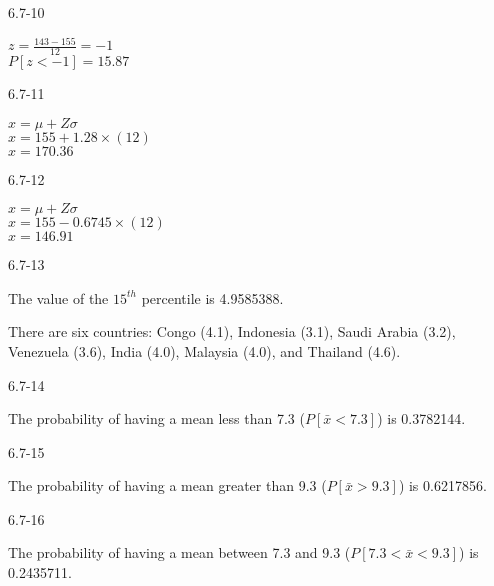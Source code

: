 \begin{exsol@solution}{6.7-10}

	    $z = \frac{143 - 155}{12} = -1$ \\
	    $P[z < -1] = 15.87$

\end{exsol@solution}
\begin{exsol@solution}{6.7-11}

	    $x = \mu + Z \sigma$ \\
	    $x = 155 + 1.28 \times (12) $ \\
	    $x = 170.36$

\end{exsol@solution}
\begin{exsol@solution}{6.7-12}

	    $x = \mu + Z \sigma$ \\
	    $x = 155 - 0.6745 \times (12) $ \\
	    $x = 146.91$

\end{exsol@solution}
\begin{exsol@solution}{6.7-13}



	  The value of the $15^{th}$ percentile is 4.9585388.

	  There are six countries: Congo (4.1), Indonesia (3.1), Saudi Arabia (3.2), Venezuela (3.6), India (4.0), Malaysia (4.0), and Thailand (4.6).

\end{exsol@solution}
\begin{exsol@solution}{6.7-14}



    The probability of having a mean less than 7.3 ($P[ \bar{x} < 7.3 ]$) is 0.3782144.

\end{exsol@solution}
\begin{exsol@solution}{6.7-15}



    The probability of having a mean greater than 9.3 ($P[ \bar{x} > 9.3 ]$) is 0.6217856.

\end{exsol@solution}
\begin{exsol@solution}{6.7-16}



    The probability of having a mean between 7.3 and  9.3 ($P[ 7.3 < \bar{x} < 9.3 ]$) is 0.2435711.

\end{exsol@solution}
